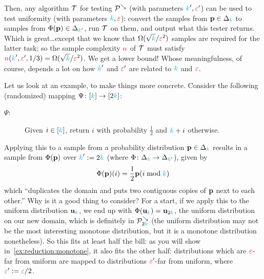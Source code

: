 \noindent Then, any algorithm $\mathcal{T}$ for testing $\mathcal{P}^{\searrow}$ (with parameters ${\textcolor{cyan}{k}}',\textcolor{red}{\varepsilon}'$) can be used to test uniformity (with parameters ${\textcolor{cyan}{k}},\textcolor{red}{\varepsilon}$): convert the samples from $\mathbf{p}\in\Delta_{{\textcolor{cyan}{k}}}$ to samples from $\Phi(\mathbf{p})\in\Delta_{{\textcolor{cyan}{k}}'}$, run $\mathcal{T}$ on them, and output what this tester returns. Which is great\dots except that we know that $\Omega(\sqrt{{\textcolor{cyan}{k}}}/\textcolor{red}{\varepsilon}^2)$ samples are required for the latter task; so the sample complexity ${\textcolor{purple}{n}}$ of $\mathcal{T}$ must satisfy ${\textcolor{purple}{n}}({\textcolor{cyan}{k}}',\textcolor{red}{\varepsilon}',1/3) = \Omega(\sqrt{{\textcolor{cyan}{k}}}/\textcolor{red}{\varepsilon}^2)$. We get a lower bound! Whose meaningfulness, of course, depends a lot on how ${\textcolor{cyan}{k}}'$ and $\textcolor{red}{\varepsilon}'$ are related to ${\textcolor{cyan}{k}}$ and $\textcolor{red}{\varepsilon}$.\smallskip

Let us look at an example, to make things more concrete. Consider the following (randomized) mapping $\Psi\colon[{\textcolor{cyan}{k}}]\to[2{\textcolor{cyan}{k}}]$: 
\begin{description}
	\item[$\Psi$:] Given $i \in [{\textcolor{cyan}{k}}]$, return $i$ with probability $\frac{1}{2}$ and ${\textcolor{cyan}{k}}+i$ otherwise.
\end{description}
Applying this to a sample from a probability distribution $\mathbf{p}\in\Delta_{{\textcolor{cyan}{k}}}$ results in a sample from $\Phi(\mathbf{p})$ over ${\textcolor{cyan}{k}}':=2{\textcolor{cyan}{k}}$ (where $\Phi\colon\Delta_{{\textcolor{cyan}{k}}}\to\Delta_{{\textcolor{cyan}{k}}'}$), given by
\begin{equation}
	\label{eq:reduction:monotonicity}
	\Phi(\mathbf{p})(i) = \frac{1}{2}\mathbf{p}(i\bmod{\textcolor{cyan}{k}})
\end{equation}
which ``duplicates the domain and puts two contiguous copies of $\mathbf{p}$ next to each other.'' Why is it a good thing to consider? For a start, if we apply this to the uniform distribution $\mathbf{u}_{\textcolor{cyan}{k}}$, we end up with $\Phi(\mathbf{u}_{\textcolor{cyan}{k}}) = \mathbf{u}_{2{\textcolor{cyan}{k}}}$, the uniform distribution on our new domain, which is definitely in $\mathcal{P}^{\searrow}_{2{\textcolor{cyan}{k}}}$ (the uniform distribution may not be the most interesting monotone distribution, but it is a monotone distribution nonetheless). So this fits at least half the bill: as you will show in~\cref{ex:reduction:monotone}, it also fits the other half: distributions which are $\textcolor{red}{\varepsilon}$-far from uniform are mapped to distributions $\textcolor{red}{\varepsilon}'$-far from uniform, where $\textcolor{red}{\varepsilon}':= \textcolor{red}{\varepsilon}/2$.

